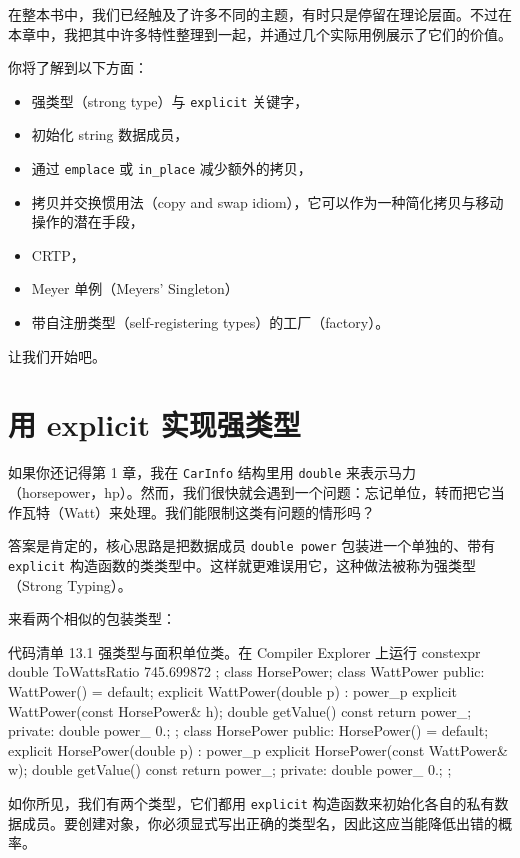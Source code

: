 在整本书中，我们已经触及了许多不同的主题，有时只是停留在理论层面。不过在本章中，我把其中许多特性整理到一起，并通过几个实际用例展示了它们的价值。

你将了解到以下方面：

\begin{itemize}
\item 强类型（strong type）与 \texttt{explicit} 关键字，
\item 初始化 string 数据成员，
\item 通过 \texttt{emplace} 或 \texttt{in\_place} 减少额外的拷贝，
\item 拷贝并交换惯用法（copy and swap idiom），它可以作为一种简化拷贝与移动操作的潜在手段，
\item CRTP，
\item Meyer 单例（Meyers' Singleton）
\item 带自注册类型（self-registering types）的工厂（factory）。
\end{itemize}

让我们开始吧。

\section{用 explicit 实现强类型}

如果你还记得第 1 章，我在 \texttt{CarInfo} 结构里用 \texttt{double} 来表示马力（horsepower，hp）。然而，我们很快就会遇到一个问题：忘记单位，转而把它当作瓦特（Watt）来处理。我们能限制这类有问题的情形吗？

答案是肯定的，核心思路是把数据成员 \texttt{double power} 包装进一个单独的、带有 \texttt{explicit} 构造函数的类类型中。这样就更难误用它，这种做法被称为强类型（Strong Typing）。

来看两个相似的包装类型：

\begin{codeboxt}[cpp]{代码清单 13.1 强类型与面积单位类。在 Compiler Explorer 上运行}
constexpr double ToWattsRatio { 745.699872 };
class HorsePower;
class WattPower {
public:
WattPower() = default;
explicit WattPower(double p) : power_{p} { }
explicit WattPower(const HorsePower& h);
double getValue() const { return power_; }
private:
double power_ {0.};
};
class HorsePower {
public:
HorsePower() = default;
explicit HorsePower(double p) : power_{p} { }
explicit HorsePower(const WattPower& w);
double getValue() const { return power_; }
private:
double power_ {0.};
};
\end{codeboxt}

如你所见，我们有两个类型，它们都用 \texttt{explicit} 构造函数来初始化各自的私有数据成员。要创建对象，你必须显式写出正确的类型名，因此这应当能降低出错的概率。

